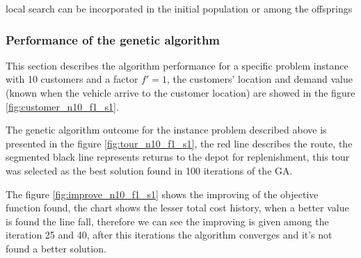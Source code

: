 local search can be incorporated in the initial population or among the offsprings

\subsubsection*{Performance of the genetic algorithm}

This section describes the algorithm performance for a specific problem instance with 10 customers and a factor $f'=1$, the customers' location and demand value (known when the vehicle arrive to the customer location) are showed in the figure \ref{fig:customer_n10_f1_s1}.



The genetic algorithm outcome for the instance problem described above is presented in the figure \ref{fig:tour_n10_f1_s1}, the red line describes the route, the segmented black line represents returns to the depot for replenishment, this tour was selected as the best solution found in 100 iterations of the GA.


The figure \ref{fig:improve_n10_f1_s1} shows the improving of the objective function found, the chart shows the lesser total cost history, when a better value is found the line fall, therefore we can see the improving is given among the iteration 25 and 40, after this iterations the algorithm converges and it's not found a better solution.





